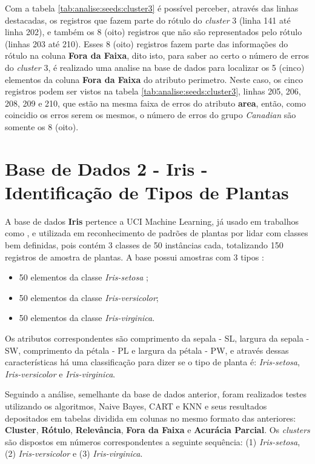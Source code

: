 Com a tabela \ref{tab:analise:seeds:cluster3} é possível perceber, através das linhas destacadas, os registros que fazem parte do rótulo do \textit{cluster} 3 (linha 141 até linha 202), e também os 8 (oito) registros que não são representados pelo rótulo (linhas 203 até 210). Esses 8 (oito) registros fazem parte das informações do rótulo na coluna \textbf{Fora da Faixa}, dito isto, para saber ao certo o número de erros do \textit{cluster} 3, é realizado uma analise na base de dados para localizar os 5 (cinco) elementos da coluna \textbf{Fora da Faixa} do atributo perimetro. Neste caso, os cinco registros podem ser vistos na tabela \ref{tab:analise:seeds:cluster3}, linhas 205, 206, 208, 209 e 210, que estão na mesma faixa de erros do atributo \textbf{area}, então, como coincidio os erros serem os mesmos, o número de erros do grupo \textit{Canadian} são somente os 8 (oito). 

\section{Base de Dados 2 - Iris - Identificação de Tipos de Plantas}


A base de dados \textbf{Iris} pertence a UCI Machine Learning, já usado em trabalhos como , e utilizada em reconhecimento de padrões de plantas por lidar com classes bem definidas, pois contém 3 classes de 50 instâncias cada, totalizando  150 registros de amostra de plantas. A base possui amostras com 3 tipos \cite{FISHER1936}:

\begin{itemize}[noitemsep]
 \item 50 elementos da classe \textit{Iris-setosa} ;
 \item 50 elementos da classe \textit{Iris-versicolor};
 \item 50 elementos da classe \textit{Iris-virginica}.
\end{itemize}

Os atributos correspondentes são comprimento da sepala - SL, largura da sepala - SW, comprimento da pétala - PL e largura da pétala - PW, e através dessas características há uma classificação para dizer se o tipo de planta é: \textit{Iris-setosa}, \textit{Iris-versicolor} e \textit{Iris-virginica}.

Seguindo a análise, semelhante da base de dados anterior, foram realizados testes utilizando os algoritmos, Naive Bayes, CART e KNN e seus resultados depositados em tabelas dividida em colunas no mesmo formato das anteriores: \textbf{Cluster}, \textbf{Rótulo}, \textbf{Relevância}, \textbf{Fora da Faixa} e \textbf{Acurácia Parcial}. Os \textit{clusters} são dispostos em números correspondentes a seguinte sequência: (1) \textit{Iris-setosa}, (2) \textit{Iris-versicolor} e (3) \textit{Iris-virginica}.
 


